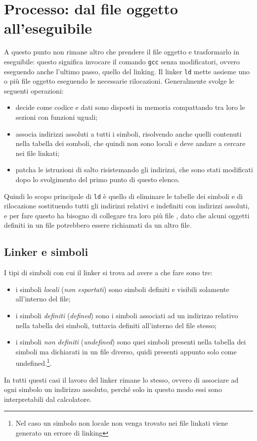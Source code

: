\documentclass[class=book, crop=false, oneside]{standalone}
\begin{document}
\section{Processo: dal file oggetto all'eseguibile}
A questo punto non rimane altro che prendere il file oggetto e trasformarlo in eseguibile: questo significa invocare il comando \texttt{gcc} senza modificatori, ovvero eseguendo anche l'ultimo passo, quello del linking.
Il linker \texttt{ld} mette assieme uno o più file oggetto eseguendo le necessarie rilocazioni. Generalmente svolge le seguenti operazioni:
\begin{itemize}
	\item decide come codice e dati sono disposti in memoria compattando tra loro le sezioni con funzioni uguali;
	\item associa indirizzi assoluti a tutti i simboli, risolvendo anche quelli contenuti nella tabella dei somboli, che quindi non sono locali e deve andare a cercare nei file  linkati;
	\item patcha le istruzioni di salto risistemando gli indirizzi, che sono stati modificati dopo lo svolgimento del primo punto di questo elenco.
\end{itemize}
Quindi lo scopo principale di \texttt{ld} è quello di eliminare le tabelle dei simboli e di rilocazione sostituendo tutti gli indirizzi relativi e indefiniti con indirizzi assoluti, e per fare questo ha bisogno di collegare tra loro più file , dato che alcuni oggetti definiti in un file potrebbero essere richiamati da un altro file.

\subsection{Linker e simboli}
I tipi di simboli con cui il linker si trova ad avere a che fare sono tre:
\begin{itemize}
	\item i simboli \emph{locali} (\emph{non esportati}) sono simboli definiti e visibili solamente all'interno del file;
	\item i simboli \emph{definiti} (\emph{defined}) sono i simboli associati ad un indirizzo relativo nella tabella dei simboli, tuttavia definiti all'interno del file stesso;
	\item i simboli \emph{non definiti} (\emph{undefined}) sono quei simboli presenti nella tabella dei simboli ma dichiarati in un file diverso, quidi presenti appunto solo come undefined.\footnote{Nel caso un simbolo non locale non venga trovato nei file  linkati viene generato un errore di linking}.
\end{itemize}
In tutti questi casi il lavoro del linker rimane lo stesso, ovvero di associare ad ogni simbolo un indirizzo assoluto, perché solo in questo modo essi sono interpretabili dal calcolatore.
\end{document}
